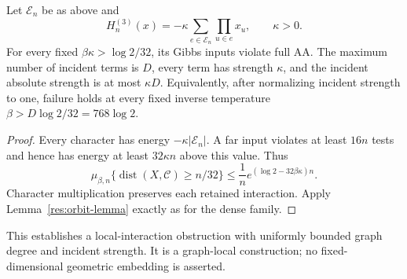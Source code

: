 \begin{theorem}
\label{res:sparse-theorem}
Let $\mathcal E_n$ be as above and
\[
 H_n^{(3)}(x)=-\kappa\sum_{e\in\mathcal E_n}\prod_{u\in e}x_u,
 \qquad\kappa>0.
\]
For every fixed $\beta\kappa>\log2/32$, its Gibbs inputs violate
full AA.  The maximum number of incident terms is $D$, every term
has strength $\kappa$, and the incident absolute strength is at most
$\kappa D$.  Equivalently, after normalizing incident strength to
one, failure holds at every fixed inverse temperature
$\beta>D\log2/32=768\log2$.
\end{theorem}

\begin{proof}
Every character has energy $-\kappa|\mathcal E_n|$.  A far input
violates at least $16n$ tests and hence has energy at least $32\kappa n$
above this value.  Thus
\[
 \mu_{\beta,n}\{\operatorname{dist}(X,\mathcal C)\ge n/32\}
 \le\frac1n e^{(\log2-32\beta\kappa)n}.
\]
Character multiplication preserves each retained interaction.  Apply
Lemma~\ref{res:orbit-lemma} exactly as for the dense family.
\end{proof}

This establishes a local-interaction obstruction with uniformly
bounded graph degree and incident strength.  It is a graph-local
construction; no fixed-dimensional geometric embedding is asserted.
